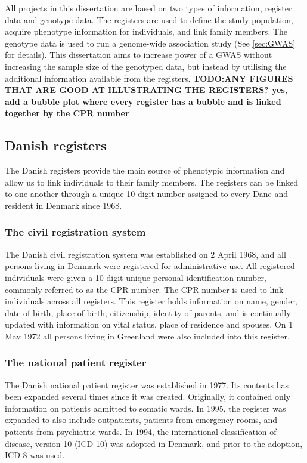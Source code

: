 All projects in this dissertation are based on two types of information, 
register data and genotype data. The registers are used to define the study 
population, acquire phenotype information for individuals, and link family 
members. The genotype data is used to run a genome-wide association study (See 
\cref{sec:GWAS} for details). This dissertation aims to increase power of a 
GWAS without increasing the sample size of the genotyped data, but instead by 
utilising the additional information available from the registers. 
\textbf{TODO:ANY FIGURES THAT ARE GOOD AT ILLUSTRATING THE REGISTERS? yes, add a bubble plot where every register has a bubble and is 
linked together by the CPR number}

\subsection{Danish registers}
The Danish registers provide the main source of phenotypic information and allow us to link individuals to their family members. The registers can be linked to one another through a unique 10-digit number assigned to every Dane and resident in Denmark since 1968.  

\subsubsection{The civil registration system}
The Danish civil registration system was established on 2 April 1968, and all persons living in Denmark were registered for administrative use. All registered individuals were given a 10-digit unique personal identification number, commonly referred to as the CPR-number. The CPR-number is used to link individuals across all registers. This register holds information on name, gender, date of birth, place of birth, citizenship, identity of parents, and is continually updated with information on vital status, place of residence and spouses. On 1 May 1972 all persons living in Greenland were also included into this register\cite{pedersen2011danish}. 

\subsubsection{The national patient register}
The Danish national patient register was established in 1977. Its contents has been expanded several times since it was created. Originally, it contained only information on patients admitted to somatic wards. In 1995, the register was expanded to also include outpatients, patients from emergency rooms, and patients from psychiatric wards. In 1994, the international classification of disease, version 10 (ICD-10) was adopted in Denmark, and prior to the adoption, ICD-8 was used\cite{lynge2011danish}. 


